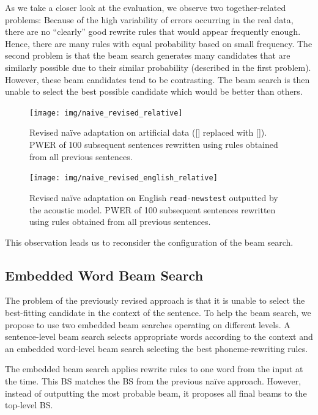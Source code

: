As we take a closer look at the evaluation, we observe two together-related problems: Because of the high variability of errors occurring in the real data, there are no ``clearly'' good rewrite rules that would appear frequently enough. Hence, there are many rules with equal probability based on small frequency. The second problem is that the beam search generates many candidates that are similarly possible due to their similar probability (described in the first problem). However, these beam candidates tend to be contrasting. The beam search is then unable to select the best possible candidate which would be better than others.

\begin{figure}[h]
    \texttt{[image: img/naive\_revised\_relative]}
    \caption[Revised na\"ive adaptation on artificial data]{Revised na\"ive adaptation on artificial data ([] replaced with []). PWER of 100 subsequent sentences rewritten using rules obtained from all previous sentences.}
    \label{fig:naive_revised} 
\end{figure}

\begin{figure}[h]
    \texttt{[image: img/naive\_revised\_english\_relative]}
    \caption[Revised na\"ive adaptation on English]{Revised na\"ive adaptation on English \texttt{read-newstest} outputted by the acoustic model. PWER of 100 subsequent sentences rewritten using rules obtained from all previous sentences.}
    \label{fig:naive_revised_en} 
\end{figure}

This observation leads us to reconsider the configuration of the beam search.

\subsection{Embedded Word Beam Search}
The problem of the previously revised approach is that it is unable to select the best-fitting candidate in the context of the sentence. To help the beam search, we propose to use two embedded beam searches operating on different levels. A sentence-level beam search selects appropriate words according to the context and an embedded word-level beam search selecting the best phoneme-rewriting rules.

The embedded beam search applies rewrite rules to one word from the input at the time. This BS matches the BS from the previous na\"ive approach. However, instead of outputting the most probable beam, it proposes all final beams to the top-level BS.

